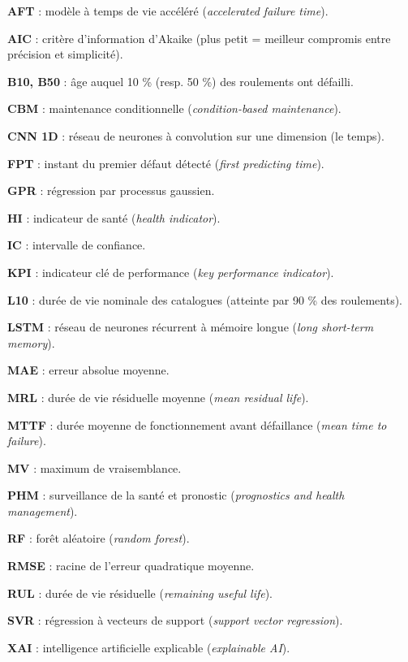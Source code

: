 {\small\setlength{\parskip}{2.5pt}
\textbf{AFT} : modèle à temps de vie accéléré (\emph{accelerated failure time}).

\textbf{AIC} : critère d'information d'Akaike (plus petit = meilleur compromis entre précision et simplicité).

\textbf{B10, B50} : âge auquel 10 \% (resp. 50 \%) des roulements ont défailli.

\textbf{CBM} : maintenance conditionnelle (\emph{condition-based maintenance}).

\textbf{CNN 1D} : réseau de neurones à convolution sur une dimension (le temps).

\textbf{FPT} : instant du premier défaut détecté (\emph{first predicting time}).

\textbf{GPR} : régression par processus gaussien.

\textbf{HI} : indicateur de santé (\emph{health indicator}).

\textbf{IC} : intervalle de confiance.

\textbf{KPI} : indicateur clé de performance (\emph{key performance indicator}).

\textbf{L10} : durée de vie nominale des catalogues (atteinte par 90 \% des roulements).

\textbf{LSTM} : réseau de neurones récurrent à mémoire longue (\emph{long short-term memory}).

\textbf{MAE} : erreur absolue moyenne.

\textbf{MRL} : durée de vie résiduelle moyenne (\emph{mean residual life}).

\textbf{MTTF} : durée moyenne de fonctionnement avant défaillance (\emph{mean time to failure}).

\textbf{MV} : maximum de vraisemblance.

\textbf{PHM} : surveillance de la santé et pronostic (\emph{prognostics and health management}).

\textbf{RF} : forêt aléatoire (\emph{random forest}).

\textbf{RMSE} : racine de l'erreur quadratique moyenne.

\textbf{RUL} : durée de vie résiduelle (\emph{remaining useful life}).

\textbf{SVR} : régression à vecteurs de support (\emph{support vector regression}).

\textbf{XAI} : intelligence artificielle explicable (\emph{explainable AI}).
}
